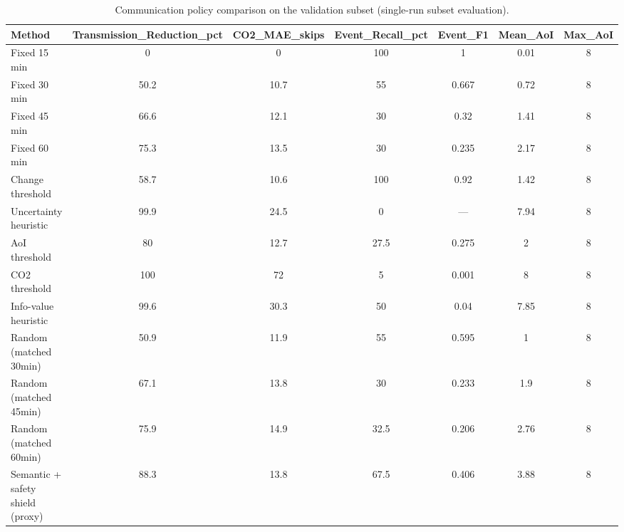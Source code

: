 \begin{table}[t]
\centering
\caption{Communication policy comparison on the validation subset (single-run subset evaluation).}
\label{tab:policies}
\begin{tabular}{lcccccc}
\toprule
Method & Transmission\_Reduction\_pct & CO2\_MAE\_skips & Event\_Recall\_pct & Event\_F1 & Mean\_AoI & Max\_AoI \\
\midrule
Fixed 15 min & 0 & 0 & 100 & 1 & 0.01 & 8 \\
Fixed 30 min & 50.2 & 10.7 & 55 & 0.667 & 0.72 & 8 \\
Fixed 45 min & 66.6 & 12.1 & 30 & 0.32 & 1.41 & 8 \\
Fixed 60 min & 75.3 & 13.5 & 30 & 0.235 & 2.17 & 8 \\
Change threshold & 58.7 & 10.6 & 100 & 0.92 & 1.42 & 8 \\
Uncertainty heuristic & 99.9 & 24.5 & 0 & --- & 7.94 & 8 \\
AoI threshold & 80 & 12.7 & 27.5 & 0.275 & 2 & 8 \\
CO2 threshold & 100 & 72 & 5 & 0.001 & 8 & 8 \\
Info-value heuristic & 99.6 & 30.3 & 50 & 0.04 & 7.85 & 8 \\
Random (matched 30min) & 50.9 & 11.9 & 55 & 0.595 & 1 & 8 \\
Random (matched 45min) & 67.1 & 13.8 & 30 & 0.233 & 1.9 & 8 \\
Random (matched 60min) & 75.9 & 14.9 & 32.5 & 0.206 & 2.76 & 8 \\
Semantic + safety shield (proxy) & 88.3 & 13.8 & 67.5 & 0.406 & 3.88 & 8 \\
\bottomrule
\end{tabular}
\end{table}
